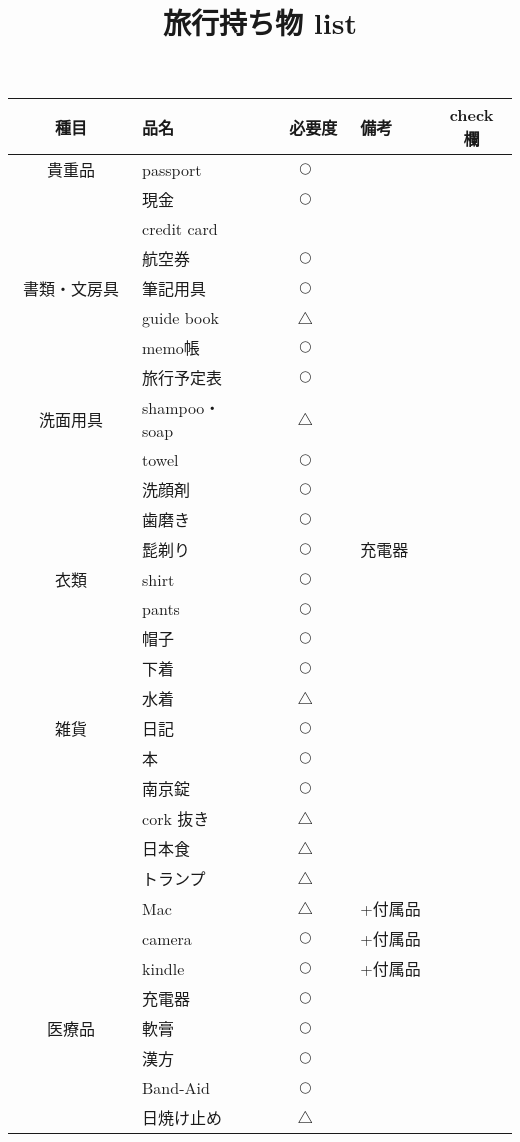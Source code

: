 \documentclass[11pt,a4paper]{article}
\title{旅行持ち物 list}
\date{}
\newcommand{\maru}{$\bigcirc$}
\newcommand{\sankaku}{$\bigtriangleup$}
\begin{document}
\maketitle

\begin{center}
\begin{table}[htb]
	\begin{tabular}{| c | l | c | l | c |} \hline
		種目 & 品名 &　必要度　& 備考 & check 欄\\ \hline \hline
		貴重品　		& passport &  \maru &  & \\ \cline{2-5}
		 			& 現金 & \maru & & \\ \cline{2-5}
					& credit card &  & & \\ \cline{2-5}
					& 航空券 & \maru & & \\ \hline
		書類・文房具	& 筆記用具 & \maru & & \\ \cline{2-5}
					& guide book & \sankaku & & \\ \cline{2-5}
					& memo帳 & \maru & & \\ \cline{2-5}
					& 旅行予定表& \maru & & \\ \hline
		洗面用具　　　& shampoo・soap &\sankaku & & \\ \cline{2-5}
					& towel & \maru & & \\ \cline{2-5}
					& 洗顔剤 & \maru & & \\ \cline{2-5}
					& 歯磨き & \maru & & \\ \cline{2-5}
					& 髭剃り & \maru & 充電器　& \\ \hline
		 衣類　　		& shirt &\maru & & \\ \cline{2-5}
		 			& pants &\maru & & \\ \cline{2-5}
					& 帽子 &\maru & & \\ \cline{2-5}
					& 下着 &\maru & & \\ \cline{2-5}
		 			& 水着 &\sankaku & & \\ \hline
		雑貨　　		& 日記 &\maru & & \\ \cline{2-5}
					& 本 &\maru & & \\ \cline{2-5}
					& 南京錠 &\maru & & \\ \cline{2-5}
					& cork 抜き &\sankaku & & \\ \cline{2-5}
					& 日本食 &\sankaku & & \\ \cline{2-5}
					& トランプ &\sankaku & & \\ \cline{2-5}
					& Mac &\sankaku &+付属品 & \\ \cline{2-5}
					& camera &\maru & +付属品 & \\ \cline{2-5}
					& kindle &\maru & +付属品 & \\ \cline{2-5}
					& 充電器 &\maru & & \\ \hline
		医療品　		& 軟膏 &\maru & & \\ \cline{2-5}
					& 漢方 &\maru & & \\ \cline{2-5}
					& Band-Aid &\maru & & \\ \cline{2-5}
					& 日焼け止め &\sankaku & & \\ \hline							
	\end{tabular}
\end{table}
\end{center}
\end{document}
